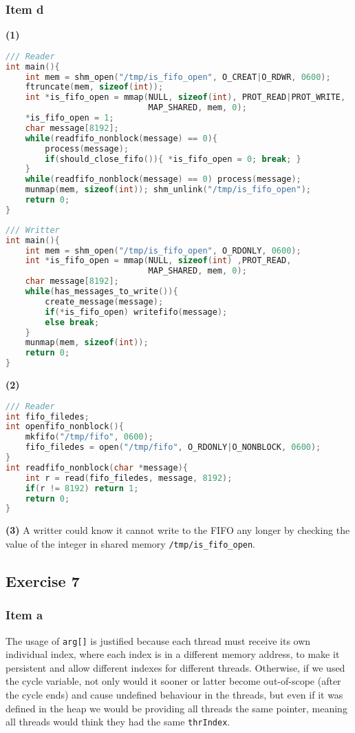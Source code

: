 {\subsubsection{Item d}
\textbf{(1)}
\begin{lstlisting}[language=C]
/// Reader
int main(){
    int mem = shm_open("/tmp/is_fifo_open", O_CREAT|O_RDWR, 0600);
    ftruncate(mem, sizeof(int));
    int *is_fifo_open = mmap(NULL, sizeof(int), PROT_READ|PROT_WRITE,
                             MAP_SHARED, mem, 0);
    *is_fifo_open = 1;
    char message[8192];
    while(readfifo_nonblock(message) == 0){
        process(message);
        if(should_close_fifo()){ *is_fifo_open = 0; break; }
    }
    while(readfifo_nonblock(message) == 0) process(message);
    munmap(mem, sizeof(int)); shm_unlink("/tmp/is_fifo_open");
    return 0;
}
\end{lstlisting}
\begin{lstlisting}[language=C]
/// Writter
int main(){
    int mem = shm_open("/tmp/is_fifo_open", O_RDONLY, 0600);
    int *is_fifo_open = mmap(NULL, sizeof(int) ,PROT_READ,
                             MAP_SHARED, mem, 0);
    char message[8192];
    while(has_messages_to_write()){
        create_message(message);
        if(*is_fifo_open) writefifo(message);
        else break;
    }
    munmap(mem, sizeof(int));
    return 0;
}
\end{lstlisting}

\textbf{(2)}
\begin{lstlisting}[language=C]
/// Reader
int fifo_filedes;
int openfifo_nonblock(){
    mkfifo("/tmp/fifo", 0600);
    fifo_filedes = open("/tmp/fifo", O_RDONLY|O_NONBLOCK, 0600);
}
int readfifo_nonblock(char *message){
    int r = read(fifo_filedes, message, 8192);
    if(r != 8192) return 1;
    return 0;
}
\end{lstlisting}
\textbf{(3)}
A writter could know it cannot write to the FIFO any longer by checking the value of the integer in shared memory \texttt{/tmp/is\_fifo\_open}.

\subsection{Exercise 7}
\subsubsection{Item a}
The usage of \texttt{arg[]} is justified because each thread must receive its own individual index, where each index is in a different memory address, to make it persistent and allow different indexes for different threads. Otherwise, if we used the cycle variable, not only would it sooner or latter become out-of-scope (after the cycle ends) and cause undefined behaviour in the threads, but even if it was defined in the heap we would be providing all threads the same pointer, meaning all threads would think they had the same \texttt{thrIndex}.

}
